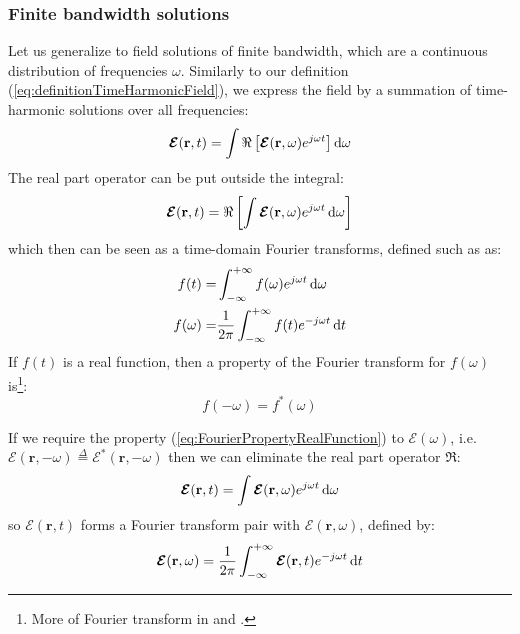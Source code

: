 \subsubsection{Finite bandwidth solutions}
Let us generalize to field solutions of finite bandwidth, which are a continuous distribution of frequencies $\omega$. Similarly to our definition  (\ref{eq:definitionTimeHarmonicField}), we express the field by a summation of time-harmonic solutions over all frequencies:
\begin{equation}
\boldsymbol{\mathcal{E}}(\mathbf{r}, t)
=
\int
\Re \left[
\boldsymbol{\mathcal{E}}(\mathbf{r}, \omega)
e^{j\omega t}
\right] 
\mathop{}\!\mathrm{d} \omega
\end{equation}
The real part operator can be put outside the integral:
\begin{equation}
\boldsymbol{\mathcal{E}}(\mathbf{r}, t)
=
\Re \left[
\int
\boldsymbol{\mathcal{E}}(\mathbf{r}, \omega)
e^{j\omega t}
\mathop{}\!\mathrm{d} \omega
\right] 
\end{equation}
which then can be seen as a time-domain Fourier transforms, defined such as as:
\begin{subequations}
	\begin{align}
		f(t) =& \int_{-\infty}^{+\infty} f(\omega) e^{j\omega t} \mathop{}\!\mathrm{d} \omega \\
	f(\omega) =& \frac{1}{2\pi}\int_{-\infty}^{+\infty} f(t) e^{-j\omega t} \mathop{}\!\mathrm{d} t 
	\end{align}
	\label{eq:FourierTransformTime}
\end{subequations}
If $f(t)$ is a real function, then a property of the Fourier transform for $f(\omega)$ is\footnote{More of Fourier transform in \parencite[sec.1.3]{Clemmow1996} and \parencite[chap.4]{Harrington2001}.}:
\begin{equation}
f(-\omega) = f^*(\omega)
\label{eq:FourierPropertyRealFunction}
\end{equation}


If we require the property  (\ref{eq:FourierPropertyRealFunction}) to $\boldsymbol{\mathcal{E}}(\omega)$, i.e. $
\boldsymbol{\mathcal{E}}(\mathbf{r}, -\omega)
\overset{\Delta}{=}
\boldsymbol{\mathcal{E}}^*(\mathbf{r}, -\omega)
$
then we can eliminate the real part operator $\Re$:
\begin{equation}
\boldsymbol{\mathcal{E}}(\mathbf{r}, t)
=
\int
\boldsymbol{\mathcal{E}}(\mathbf{r}, \omega)
e^{j\omega t}
\mathop{}\!\mathrm{d} \omega
\label{eq:FourierTimeHarmonicDef}
\end{equation}
so $\boldsymbol{\mathcal{E}}(\mathbf{r}, t)$ forms a Fourier transform pair with $\boldsymbol{\mathcal{E}}(\mathbf{r}, \omega)$,  defined by:
\begin{equation}
	\boldsymbol{\mathcal{E}}(\mathbf{r}, \omega) = \frac{1}{2\pi}\int_{-\infty}^{+\infty} 
	\boldsymbol{\mathcal{E}}(\mathbf{r}, t)
	 e^{-j\omega t} \mathop{}\!\mathrm{d} t 
	 \label{eq:TimeFourierTransformE}
\end{equation}

